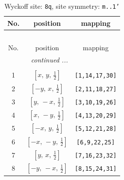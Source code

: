 \documentclass[fleqn,8pt]{jsarticle}
\begin{document}
\renewcommand{\arraystretch}{1.2}
\begin{longtable}{ccc}
\caption{Wyckoff site: {\tt 8q}, site symmetry: {\tt m..1'}}
 \\
 \hline \hline
No. & position & mapping \\ \hline \endfirsthead

\multicolumn{2}{l}{\tablename\ \thetable{}} \\
 \hline \hline
No. & position & mapping \\ \hline \endhead

 \hline \hline
\multicolumn{2}{r}{\footnotesize\it continued ...} \\ \endfoot

 \hline \hline
\multicolumn{2}{r}{} \\ \endlastfoot

1 & $\left[ x,\, y,\, \frac{1}{2} \right]$ & {\tt [1,14,17,30]} \\ \hline
2 & $\left[ - y,\, x,\, \frac{1}{2} \right]$ & {\tt [2,11,18,27]} \\ \hline
3 & $\left[ y,\, - x,\, \frac{1}{2} \right]$ & {\tt [3,10,19,26]} \\ \hline
4 & $\left[ x,\, - y,\, \frac{1}{2} \right]$ & {\tt [4,13,20,29]} \\ \hline
5 & $\left[ - x,\, y,\, \frac{1}{2} \right]$ & {\tt [5,12,21,28]} \\ \hline
6 & $\left[ - x,\, - y,\, \frac{1}{2} \right]$ & {\tt [6,9,22,25]} \\ \hline
7 & $\left[ y,\, x,\, \frac{1}{2} \right]$ & {\tt [7,16,23,32]} \\ \hline
8 & $\left[ - y,\, - x,\, \frac{1}{2} \right]$ & {\tt [8,15,24,31]} \\
\end{longtable}
\renewcommand{\arraystretch}{1.2}
\end{document}
